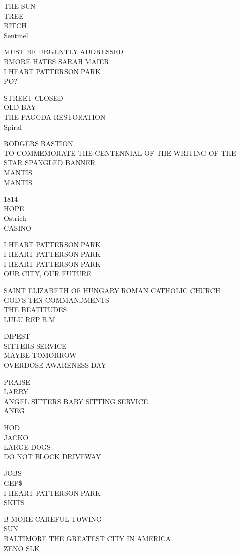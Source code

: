 \documentclass[10pt,letterpaper]{article}
\begin{document}
THE SUN\\
TREE\\
BITCH\\
Sentinel

MUST BE URGENTLY ADDRESSED\\
BMORE HATES SARAH MAIER\\
I HEART PATTERSON PARK\\
PO?

STREET CLOSED\\
OLD BAY\\
THE PAGODA RESTORATION\\
Spiral

RODGERS BASTION\\
TO COMMEMORATE THE CENTENNIAL OF THE WRITING OF THE STAR SPANGLED BANNER\\
MANTIS\\
MANTIS

1814\\
HOPE\\
Ostrich\\
CASINO

I HEART PATTERSON PARK\\
I HEART PATTERSON PARK\\
I HEART PATTERSON PARK\\
OUR CITY, OUR FUTURE

SAINT ELIZABETH OF HUNGARY ROMAN CATHOLIC CHURCH\\
GOD'S TEN COMMANDMENTS\\
THE BEATITUDES\\
LULU REP B.M.

DIPEST\\
SITTERS SERVICE\\
MAYBE TOMORROW\\
OVERDOSE AWARENESS DAY

PRAISE\\
LARRY\\
ANGEL SITTERS BABY SITTING SERVICE\\
ANEG

HOD\\
JACKO\\
LARGE DOGS\\
DO NOT BLOCK DRIVEWAY

JOBS\\
GEP\$\\
I HEART PATTERSON PARK\\
SKITS

B{-}MORE CAREFUL TOWING\\
SUN\\
BALTIMORE THE GREATEST CITY IN AMERICA\\
ZENO SLK
\end{document}
